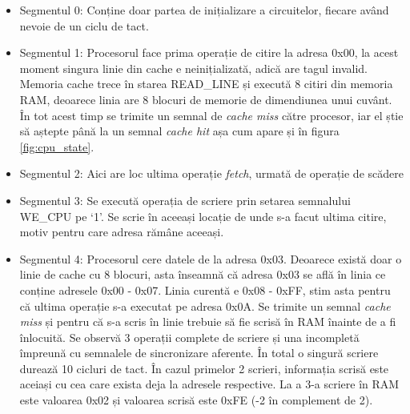 \documentclass[../main.tex]{subfiles}
\begin{document}
\begin{itemize}
    \item Segmentul 0: Conține doar partea de inițializare a circuitelor, fiecare având nevoie de un ciclu de tact.
    \item Segmentul 1: Procesorul face prima operație de citire la adresa 0x00, la acest moment singura linie din cache e
    neinițializată, adică are tagul invalid. Memoria cache trece în starea READ\_LINE și execută 8 citiri din memoria RAM,
    deoarece linia are 8 blocuri de memorie de dimendiunea unui cuvânt. În tot acest timp se trimite un semnal de
    \emph{cache miss} către procesor, iar el știe să aștepte până la un semnal \emph{cache hit} așa cum apare și în figura
    \ref{fig:cpu_state}.
    \item Segmentul 2: Aici are loc ultima operație \emph{fetch}, urmată de operație de scădere
    \item Segmentul 3: Se execută operația de scriere prin setarea semnalului WE\_CPU pe `1'. Se scrie în aceeași
    locație de unde s-a facut ultima citire, motiv pentru care adresa rămâne aceeași.
    \item Segmentul 4: Procesorul cere datele de la adresa 0x03. Deoarece există doar o linie de cache cu 8 blocuri, asta
    înseamnă că adresa 0x03 se află în linia ce conține adresele 0x00 - 0x07. Linia curentă e 0x08 - 0xFF, stim asta pentru
    că ultima operație s-a executat pe adresa 0x0A. Se trimite un semnal \emph{cache miss} și pentru că s-a scris în
    linie trebuie să fie scrisă în RAM înainte de a fi înlocuită. Se observă 3 operații complete de scriere și una incompletă
    împreună cu semnalele de sincronizare aferente. În total o singură scriere durează 10 cicluri de tact. În cazul primelor
    2 scrieri, informația scrisă este aceiași cu cea care exista deja la adresele respective. La a 3-a scriere în RAM este
    valoarea 0x02 și valoarea scrisă este 0xFE (-2 în complement de 2).
\end{itemize}
\end{document}
